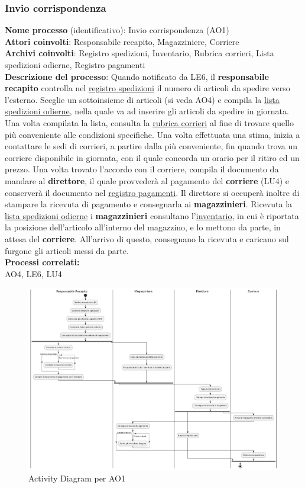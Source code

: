 \documentclass[a4paper,12pt]{article}
\begin{document}
\newpage
\subsubsection{Invio corrispondenza}
\textbf{Nome processo} (identificativo): Invio corrispondenza (AO1) \\
\textbf{Attori coinvolti}: Responsabile recapito, Magazziniere, Corriere \\
\textbf{Archivi coinvolti}: Registro spedizioni, Inventario, Rubrica corrieri, Lista spedizioni odierne, Registro pagamenti \\
\textbf{Descrizione del processo}: Quando notificato da LE6, il \textbf{responsabile recapito} controlla nel \underline{registro spedizioni} il numero di articoli
da spedire verso l'esterno. Sceglie un sottoinsieme di articoli (si veda AO4) e compila la \underline{lista spedizioni odierne}, 
nella quale va ad inserire gli articoli da spedire in giornata. Una volta compilata la lista, consulta la \underline{rubrica corrieri} al fine
di trovare quello più conveniente alle condizioni specifiche. Una volta effettuata una stima, inizia a contattare le sedi di corrieri, a partire dalla più 
conveniente, fin quando trova un corriere disponibile in giornata, con il quale concorda un orario per il ritiro ed un prezzo.
Una volta trovato l'accordo con il corriere, compila il documento da mandare al \textbf{direttore}, il quale provvederà al pagamento del \textbf{corriere} (LU4)
e conserverà il documento nel \underline{registro pagamenti}. Il direttore si occuperà inoltre di stampare la ricevuta di pagamento e 
consegnarla ai \textbf{magazzinieri}.
Ricevuta la \underline{lista spedizioni odierne} i \textbf{magazzinieri} consultano l'\underline{inventario}, in cui è riportata la posizione dell'articolo
all'interno del magazzino, e lo mettono da parte, in attesa del \textbf{corriere}. All'arrivo di questo, consegnano la ricevuta e caricano sul furgone gli articoli messi da parte. \\
\textbf{Processi correlati:}\\AO4, LE6, LU4\\
\begin{figure}[H]
  \centering
  \includegraphics[width=0.8\linewidth]{assets/activitydiagram_AO1.png}
  \caption{Activity Diagram per AO1}
\end{figure}
\end{document}
